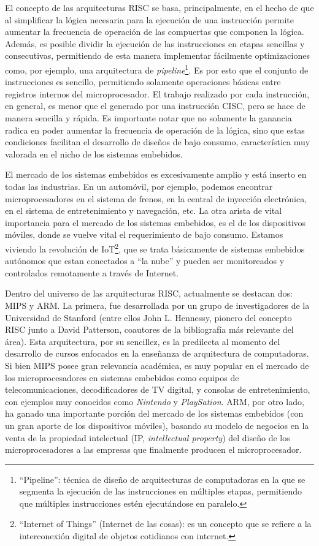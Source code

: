 El concepto de las arquitecturas RISC se basa, principalmente, en el hecho de
que al simplificar la lógica necesaria para la ejecución de una instrucción
permite aumentar la frecuencia de operación de las compuertas que componen la
lógica. Además, es posible dividir la ejecución de las instrucciones en etapas
sencillas y consecutivas, permitiendo de esta manera implementar fácilmente
optimizaciones como, por ejemplo, una arquitectura de
\emph{pipeline}\footnote{``Pipeline'': técnica de diseño de arquitecturas de
computadoras en la que se segmenta la ejecución de las instrucciones en
múltiples etapas, permitiendo que múltiples instrucciones estén ejecutándose en
paralelo.}. Es por esto que el conjunto de instrucciones es sencillo,
permitiendo solamente operaciones básicas entre registros internos del
microprocesador. El trabajo realizado por cada instrucción, en general, es menor
que el generado por una instrucción CISC, pero se hace de manera sencilla y
rápida. Es importante notar que no solamente la ganancia radica en poder
aumentar la frecuencia de operación de la lógica, sino que estas condiciones
facilitan el desarrollo de diseños de bajo consumo, característica muy valorada
en el nicho de los sistemas embebidos.

El mercado de los sistemas embebidos es excesivamente amplio y está inserto en
todas las industrias. En un automóvil, por ejemplo, podemos encontrar
microprocesadores en el sistema de frenos, en la central de inyección
electrónica, en el sistema de entretenimiento y navegación, etc. La otra arista
de vital importancia para el mercado de los sistemas embebidos, es el de los
dispositivos móviles, donde se vuelve vital el requerimiento de bajo consumo.
Estamos viviendo la revolución de IoT\footnote{``Internet of Things'' (Internet
de las cosas): es un concepto que se refiere a la interconexión digital de
objetos cotidianos con internet.}, que se trata básicamente de sistemas
embebidos autónomos que estan conectados a ``la nube'' y pueden ser monitoreados
y controlados remotamente a través de Internet.

Dentro del universo de las arquitecturas RISC, actualmente se destacan dos: MIPS
y ARM. La primera, fue desarrollada por un grupo de investigadores de la
Universidad de Stanford (entre ellos John L. Hennessy, pionero del concepto RISC
junto a David Patterson, coautores de la bibliografía más relevante del área).
Esta arquitectura, por su sencillez, es la predilecta al momento del desarrollo
de cursos enfocados en la enseñanza de arquitectura de computadoras. Si bien
MIPS posee gran relevancia académica, es muy popular en el mercado de los
microprocesadores en sistemas embebidos como equipos de telecomunicaciones,
decodificadores de TV digital, y consolas de entretenimiento, con ejemplos muy
conocidos como \emph{Nintendo} y \emph{PlaySation}. ARM, por otro lado, ha
ganado una importante porción del mercado de los sistemas embebidos (con un gran
aporte de los dispositivos móviles), basando su modelo de negocios en la venta
de la propiedad intelectual (IP, \emph{intellectual property}) del diseño de los
microprocesadores a las empresas que finalmente producen el microprocesador.


